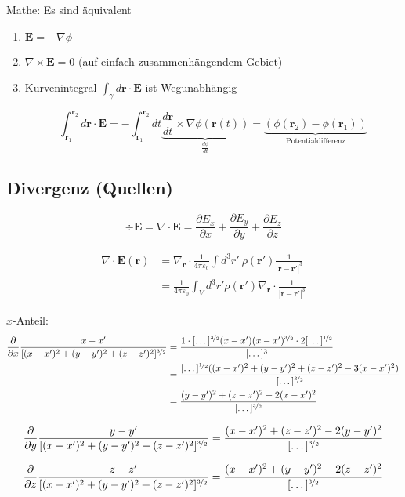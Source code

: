 \documentclass[titlepage,11pt,a4paper,ngerman]{report}
\newcommand{\prt}[2]{\frac{\partial #1}{\partial #2}}
\newcommand{\kq}{\frac{1}{4\pi\epsilon_0}}
\newcommand{\intt}[2]{\int_{#1}^{#2}}
\renewcommand{\vec}[1]{\boldsymbol{#1}}
\renewcommand{\epsilon}{\varepsilon}
\begin{document}
Mathe: Es sind äquivalent 
\begin{enumerate}[i]
	\item $\vec{E} = - \nabla\phi$
	\item $\nabla \times \vec{E} = 0$ (auf einfach zusammenhängendem Gebiet)
	\item Kurvenintegral $\int_\gamma d\vec{r} \cdot \vec{E}$ ist Wegunabhängig 
	
	
	
	
	
	
	$$\intt{\vec{r}_1}{\vec{r}_2} d\vec{r} \cdot \vec{E} = - \intt{\vec{r}_1}{\vec{r}_2} dt \underbrace{\frac{d\vec{r}}{dt}\times \nabla\phi(\vec{r}(t))}_{\frac{d\phi}{dt}} = \underbrace{(\phi(\vec{r}_2) - \phi(\vec{r}_1))}_{\textrm{Potentialdifferenz}} $$
\end{enumerate}

\subsection{Divergenz (Quellen)}

$$\div \vec{E} = \nabla \cdot \vec{E} = \prt{E_x}{x} + \prt{E_y}{y} + \prt{E_z}{z}$$

\begin{align*}
\nabla \cdot \vec{E}(\vec{r}) &= \nabla_{\vec{r}} \cdot \kq \int d^3r'\ \rho(\vec{r}') \frac{1}{|\vec{r} - \vec{r}'|^3}\\
&= \kq \int_V d^3 r' \rho (\vec{r}') \nabla_{\vec{r}} \cdot \frac{1}{|\vec{r} - \vec{r}'|^3}
\end{align*}

$x$-Anteil:
\begin{align*}
\frac{\partial}{\partial x}\frac{x-x'}{[(x-x')^2 + (y-y')^2 + (z-z')^2]^{\nicefrac{3}{2}}} &= \frac{1 \cdot [\dots]^{\nicefrac{3}{2}}(x - x')(x - x')^{\nicefrac{3}{2}}\cdot 2[\dots]^{\nicefrac{1}{2}}}{[\dots]^3}\\
&= \frac{[\dots]^{\nicefrac{1}{2}}((x - x')^2 + (y - y')^2 + (z - z')^2 - 3(x - x')^2)}{[\dots]^{\nicefrac{3}{2}}}\\
&= \frac{(y - y')^2 + (z - z')^2 - 2(x - x')^2}{[\dots]^{\nicefrac{3}{2}}}
\end{align*}

$$\frac{\partial}{\partial y} \frac{y-y'}{[(x-x')^2 + (y-y')^2 + (z-z')^2]^{\nicefrac{3}{2}}} = \frac{(x - x')^2 + (z - z')^2 - 2(y - y')^2}{[\dots]^{\nicefrac{3}{2}}}$$ 

$$\frac{\partial}{\partial z} \frac{z-z'}{[(x-x')^2 + (y-y')^2 + (z-z')^2]^{\nicefrac{3}{2}}} = \frac{(x - x')^2 + (y - y')^2 - 2(z - z')^2}{[\dots]^{\nicefrac{3}{2}}}$$ 
\end{document}
